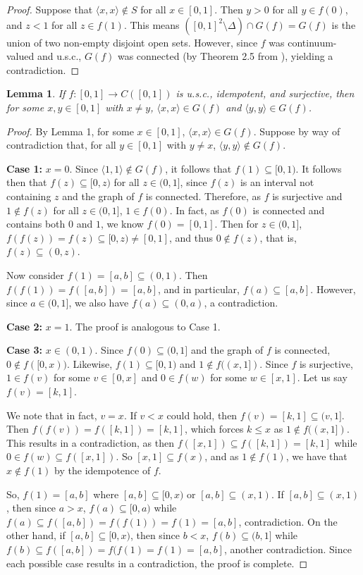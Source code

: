 \documentclass{amsart}
\newtheorem{lemma}[theorem]{Lemma}
\theoremstyle{definition}
\newcommand{\<}{\langle}
\renewcommand{\>}{\rangle}
\begin{document}
\begin{proof}
Suppose that $\<x,x\> \not\in S$ for all $x \in [0,1]$. Then $y > 0$ for all $y \in f(0)$, and $z < 1$ for all $z \in f(1)$. This means $([0,1]^2 \setminus \Delta) \cap G(f) = G(f)$ is the union of two non-empty disjoint open sets. However, since $f$ was continuum-valued and u.s.c., $G(f)$ was connected (by Theorem 2.5 from \cite{ingram intro}), yielding a contradiction.
\end{proof}

\begin{lemma}
If $f: [0,1] \rightarrow C([0,1])$ is u.s.c., idempotent, and surjective, then for some $x, y \in [0,1]$ with $x \not= y$, $\<x,x\> \in G(f)$ and $\<y,y\> \in G(f)$.
\end{lemma}

\begin{proof}
By Lemma 1, for some $x \in [0,1]$, $\<x,x\> \in G(f)$. Suppose by way of contradiction that, for all $y \in [0,1]$ with $y \not= x$, $\<y,y\> \not\in G(f)$.

\textbf{Case 1:}
$x = 0$. Since $\<1,1\> \not\in G(f)$, it follows that $f(1) \subseteq [0,1)$. It follows then that $f(z)\subseteq[0,z)$ for all $z\in(0,1]$, since $f(z)$ is an interval not containing $z$ and the graph of $f$ is connected. Therefore, as $f$ is surjective and $1 \not\in f(z)$ for all $z \in (0,1]$, $1 \in f(0)$. In fact, as $f(0)$ is connected and contains both $0$ and $1$, we know $f(0) = [0,1]$. Then for $z \in (0,1]$, $f(f(z))=f(z)\subseteq[0,z)\not=[0,1]$, and thus $0\not\in f(z)$, that is, $f(z)\subseteq(0,z)$.

Now consider $f(1)=[a,b]\subseteq(0,1)$. Then $f(f(1))=f([a,b])=[a,b]$, and in particular, $f(a)\subseteq[a,b]$. However, since $a\in(0,1]$, we also have $f(a)\subseteq(0,a)$, a contradiction.


\textbf{Case 2:}
$x = 1$. The proof is analogous to Case 1.


\textbf{Case 3:}
$x\in(0,1)$. Since $f(0)\subseteq(0,1]$ and the graph of $f$ is connected, $0\not\in f([0,x))$. Likewise, $f(1)\subseteq[0,1)$ and $1\not\in f((x,1])$. Since $f$ is surjective, $1\in f(v)$ for some $v\in[0,x]$ and $0\in f(w)$ for some $w\in[x,1]$. Let us say $f(v) = [k,1]$.

We note that in fact, $v=x$. If $v<x$ could hold, then $f(v)=[k,1]\subseteq(v,1]$. Then $f(f(v))=f([k,1])=[k,1]$, which forces $k\leq x$ as $1\not\in f((x,1])$. This results in a contradiction, as then $f([x,1])\subseteq f([k,1])=[k,1]$ while $0\in f(w)\subseteq f([x,1])$. So $[x,1]\subseteq f(x)$, and as $1\not\in f(1)$, we have that $x\not\in f(1)$ by the idempotence of $f$.

So, $f(1) = [a,b]$ where $[a,b] \subseteq [0,x)$ or $[a,b] \subseteq (x,1)$. If $[a,b] \subseteq (x,1)$, then since $a > x$, $f(a) \subseteq [0,a)$ while $f(a)\subseteq f([a,b])=f(f(1))=f(1)=[a,b]$, contradiction. On the other hand, if $[a,b] \subseteq [0,x)$, then since $b<x$, $f(b) \subseteq (b,1]$ while $f(b) \subseteq f([a,b])=f(f(1)=f(1)=[a,b]$, another contradiction. Since each possible case results in a contradiction, the proof is complete.
\end{proof}
\end{document}
